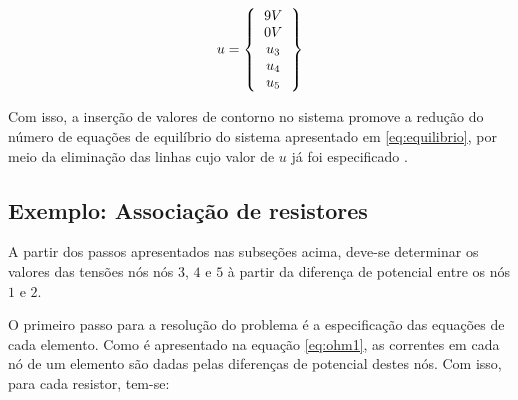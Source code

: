 \documentclass[
    12pt,               %
    openright,          %
    oneside,
    a4paper,            %
    english,            %
    french,             %
    spanish,            %
    brazil              %
    ]{abntex2}
\begin{document}
\begin{equation}
    \label{eq:condIni}
    u = 
        \left \{
        \begin{tabular}{c}
            $9V$ \\
            $0V$ \\
            $u_3$ \\
            $u_4$ \\
            $u_5$ \\
        \end{tabular}       
        \right \}   
\end{equation}

Com isso, a inserção de valores de contorno no sistema promove a redução do número de equações de equilíbrio do sistema apresentado em \ref{eq:equilibrio}, por meio da eliminação das linhas cujo valor de $u$ já foi especificado \cite[p. 5]{zien}.

\subsection{Exemplo: Associação de resistores}

A partir dos passos apresentados nas subseções acima, deve-se determinar os valores das tensões nós nós $3$, $4$ e $5$ à partir da diferença de potencial entre os nós $1$ e $2$.

O primeiro passo para a resolução do problema é a especificação das equações de cada elemento. Como é apresentado na equação \ref{eq:ohm1}, as correntes em cada nó de um elemento são dadas pelas diferenças de potencial destes nós. Com isso, para cada resistor, tem-se:
\end{document}
